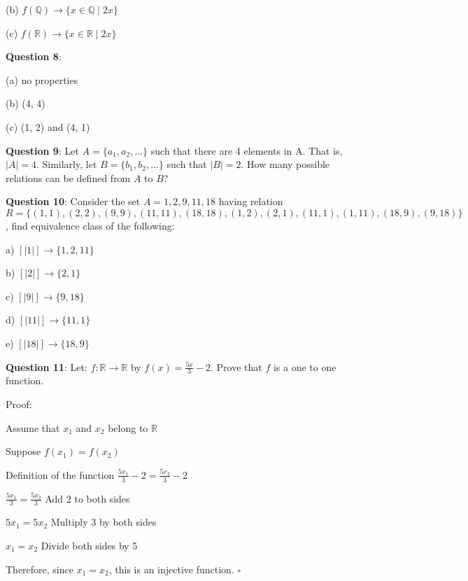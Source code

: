 \documentclass{article} %
\newcommand{\question}[2][]{\begin{flushleft}
        \textbf{Question #1}: #2
\end{flushleft}}
\begin{document}
    (b) $f(\mathbb{Q}) \rightarrow \{ x \in \mathbb{Q} \mid 2x \}$

    (c) $f(\mathbb{R}) \rightarrow \{ x \in \mathbb{R} \mid 2x \}$

    \question[8]{}

    (a) no properties

    (b) (4, 4)

    (c) (1, 2) and (4, 1)

    \question[9]{Let $A = \{a_1, a_2, \ldots \}$ such that there are 4 elements in A. That is, $|A| = 4$. Similarly,
    let $B = \{b_1, b_2, \ldots \}$ such that $|B| = 2$. How many possible relations can be defined from $A$ to $B$?}



    \question[10]{Consider the set $A = {1, 2, 9, 11, 18}$ having relation
    $R = \{(1, 1), (2, 2), (9, 9), (11, 11), (18, 18), (1, 2), (2, 1), (11, 1), (1, 11), (18, 9), (9, 18) \}$, find 
    equivalence class of the following:}

    a) $[|1|] \rightarrow \{1, 2, 11\}$

    b) $[|2|] \rightarrow \{2, 1\}$

    c) $[|9|] \rightarrow \{9, 18\}$

    d) $[|11|] \rightarrow \{11, 1\}$

    e) $[|18|] \rightarrow \{18, 9\}$

    \question[11]{Let: $f: \mathbb{R} \rightarrow \mathbb{R}$ by $f(x) = \frac{5x}{3} - 2$. Prove that $f$ is a one to one function.}

    Proof:

    Assume that $x_1$ and $x_2$ belong to $\mathbb{R}$

    Suppose $f(x_1) = f(x_2)$

    \vspace*{0.1cm}

    Definition of the function $\frac{5x_1}{3} - 2 = \frac{5x_2}{3} - 2$

    \vspace*{0.1cm}

    \tabto*{5.15cm} $\frac{5x_1}{3} = \frac{5x_2}{3}$ \tabto*{8cm} Add 2 to both sides

    \tabto*{5.15cm} $5x_1 = 5x_2$ \tabto*{8cm} Multiply 3 by both sides

    \tabto*{5.33cm} $x_1 = x_2$ \tabto*{8cm} Divide both sides by 5

    Therefore, since $x_1 = x_2$, this is an injective function. $\square$
\end{document}
